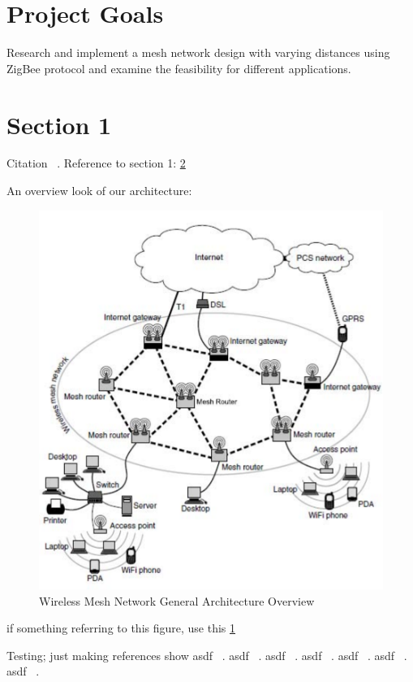 \section{Project Goals}
Research and implement a mesh network design with varying distances using ZigBee protocol and examine the feasibility for different applications.


\section{Section 1}
\label{sec:sec-1}

Citation ~\cite{book1}.
Reference to section 1: \ref{sec:sec-1}




An overview look of our architecture:

\begin{figure}[h]
    \centering
    \includegraphics[width=.5\textwidth]{images/wmn_general}
    \caption{Wireless Mesh Network General Architecture Overview~\cite{book1}}
    \label{fig:wmn_general}
\end{figure}

if something referring to this figure, use this \ref{fig:wmn_general}


Testing; just making references show
asdf ~\cite{wearable}.
asdf ~\cite{adhocmsgferry}.
asdf ~\cite{hybrid}.
asdf ~\cite{QoSrouting}.
asdf ~\cite{efficientrouting}.
asdf ~\cite{implement}.
asdf ~\cite{book1}.
